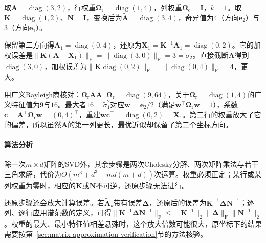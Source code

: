 \begin{example}[行加权改变保留的方向]
\label{ex:matrix-approximation-weighted-low-rank}
取$\bm A=\operatorname{diag}(3,2)$，行权重$\bm\Omega_{\mathrm r}=\operatorname{diag}(1,4)$，列权重$\bm\Omega_{\mathrm c}=\bm I$，$k=1$。取$\bm K=\operatorname{diag}(1,2)$、$\bm N=\bm I$，变换后为$\widetilde{\bm A}=\operatorname{diag}(3,4)$，奇异值为$4$（方向$\bm e_2$）与$3$（方向$\bm e_1$）。

保留第二方向得$\widetilde{\bm A}_1=\operatorname{diag}(0,4)$，还原为$\bm X_1=\bm K^{-1}\widetilde{\bm A}_1=\operatorname{diag}(0,2)$。它的加权误差是$\lVert\bm K(\bm A-\bm X_1)\rVert_{\mathrm F}=\lVert\operatorname{diag}(3,0)\rVert_{\mathrm F}=3=\tilde\sigma_2$。直接截断$\bm A$得到$\operatorname{diag}(3,0)$，加权误差为$\lVert\bm K\operatorname{diag}(0,2)\rVert_{\mathrm F}=\lVert\operatorname{diag}(0,4)\rVert_{\mathrm F}=4$，更大。

用广义Rayleigh商核对：$\bm\Omega_{\mathrm r}\bm A\bm A^\top\bm\Omega_{\mathrm r}=\operatorname{diag}(9,64)$，关于$\bm\Omega_{\mathrm r}=\operatorname{diag}(1,4)$的广义特征值为$9$与$16$。最大者$16=\tilde\sigma_1^2$对应$\bm w=\bm e_2/2$（满足$\bm w^\top\bm\Omega_{\mathrm r}\bm w=1$），系数$\bm c=\bm A^\top\bm\Omega_{\mathrm r}\bm w=(0,4)^\top$，重建$\bm w\bm c^\top=\operatorname{diag}(0,2)=\bm X_1$。第二行的权重放大了它的偏差，所以虽然$\bm A$的第一列更长，最优近似却保留了第二个坐标方向。
\end{example}

\paragraph{算法分析}

除一次$m\times d$矩阵的SVD外，其余步骤是两次Cholesky分解、两次矩阵乘法与若干三角求解，代价为$O(m^3+d^3+md(m+d))$次运算。权重必须正定；某行或某列权重为零时，相应的$\bm K$或$\bm N$不可逆，还原步骤无法进行。

还原步骤还会放大计算误差。若$\widetilde{\bm A}_k$带有误差$\bm\Delta$，还原后的误差为$\bm K^{-1}\bm\Delta\bm N^{-1}$；逐列、逐行应用谱范数的定义，可得$\lVert\bm K^{-1}\bm\Delta\bm N^{-1}\rVert_{\mathrm F}\leq\lVert\bm K^{-1}\rVert_2\lVert\bm\Delta\rVert_{\mathrm F}\lVert\bm N^{-1}\rVert_2$。权重的最大、最小特征值相差悬殊时，这个放大倍数可能很大，原坐标下的结果需要按第~\ref{sec:matrix-approximation-verification}节的方法核验。
